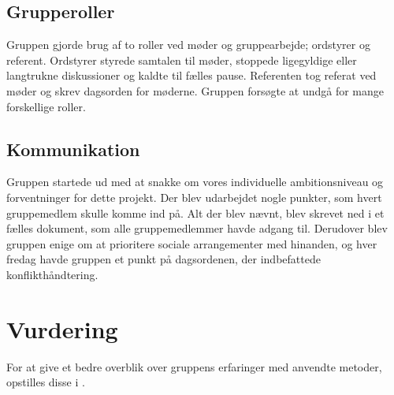 \subsection{Grupperoller}
Gruppen gjorde brug af to roller ved møder og gruppearbejde; ordstyrer og referent. Ordstyrer styrede samtalen til møder, stoppede ligegyldige eller langtrukne diskussioner og kaldte til fælles pause. Referenten tog referat ved møder og skrev dagsorden for møderne. Gruppen forsøgte at undgå for mange forskellige roller.

\subsection{Kommunikation}
Gruppen startede ud med at snakke om vores individuelle ambitionsniveau og forventninger for dette projekt. Der blev udarbejdet nogle punkter, som hvert gruppemedlem skulle komme ind på. Alt der blev nævnt, blev skrevet ned i et fælles dokument, som alle gruppemedlemmer havde adgang til. Derudover blev gruppen enige om at prioritere sociale arrangementer med hinanden, og hver fredag havde gruppen et punkt på dagsordenen, der indbefattede konflikthåndtering. 

\section{Vurdering}
For at give et bedre overblik over gruppens erfaringer med anvendte metoder, opstilles disse i .

